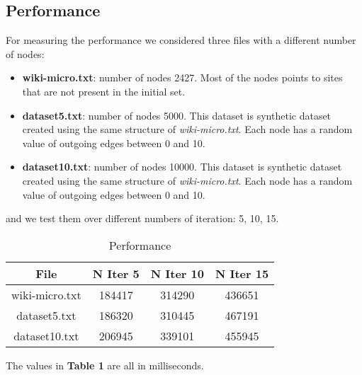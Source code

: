 \subsection{Performance}
For measuring the performance we considered three files with a different number of nodes:
\begin{itemize}
	\item \textbf{wiki-micro.txt}: number of nodes 2427. Most of the nodes points to sites that are not present in the initial set.
	\item \textbf{dataset5.txt}: number of nodes 5000. This dataset is synthetic dataset created using the same structure of \textit{wiki-micro.txt}. Each node has a random value of outgoing edges between 0 and 10.
	\item \textbf{dataset10.txt}: number of nodes 10000. This dataset is synthetic dataset created using the same structure of \textit{wiki-micro.txt}. Each node has a random value of outgoing edges between 0 and 10.
\end{itemize}
and we test them over different numbers of iteration: 5, 10, 15.

\begin{table}[H]
\caption{Performance}
\centering
\begin{tabular}{c c c c}
\hline\hline
File & N Iter 5 & N Iter 10 & N Iter 15 \\ [0.7ex] %
\hline
wiki-micro.txt&184417&314290&436651\\
dataset5.txt&186320&310445&467191 \\
dataset10.txt&206945&339101&455945 \\ [1ex]
\hline
\end{tabular}
\label{table:nonlin}
\end{table}

The values in \textbf{Table 1} are all in milliseconds.